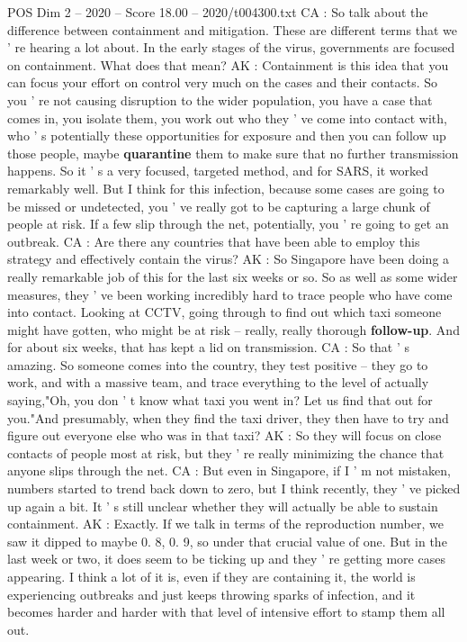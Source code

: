 \begin{textsample}{POS Dim 2 – 2020 – Score 18.00 – 2020/t004300.txt}
CA : So talk about the difference between containment and mitigation.
These are different terms that we ' re hearing a lot about.
In the early stages of the virus, governments are focused on containment.
What does that mean?
AK : Containment is this idea that you can focus your effort on control very much on the cases and their contacts.
So you ' re not causing disruption to the wider population, you have a case that comes in, you isolate them, you work out who they ' ve come into contact with, who ' s potentially these opportunities for exposure and then you can follow up those people, maybe \textbf{quarantine} them to make sure that no further transmission happens.
So it ' s a very focused, targeted method, and for SARS, it worked remarkably well.
But I think for this infection, because some cases are going to be missed or undetected, you ' ve really got to be capturing a large chunk of people at risk.
If a few slip through the net, potentially, you ' re going to get an outbreak.
CA : Are there any countries that have been able to employ this strategy and effectively contain the virus?
AK : So Singapore have been doing a really remarkable job of this for the last six weeks or so.
So as well as some wider measures, they ' ve been working incredibly hard to trace people who have come into contact.
Looking at CCTV, going through to find out which taxi someone might have gotten, who might be at risk -- really, really thorough \textbf{follow-up}.
And for about six weeks, that has kept a lid on transmission.
CA : So that ' s amazing.
So someone comes into the country, they test positive -- they go to work, and with a massive team, and trace everything to the level of actually saying,"Oh, you don ' t know what taxi you went in?
Let us find that out for you."And presumably, when they find the taxi driver, they then have to try and figure out everyone else who was in that taxi?
AK : So they will focus on close contacts of people most at risk, but they ' re really minimizing the chance that anyone slips through the net.
CA : But even in Singapore, if I ' m not mistaken, numbers started to trend back down to zero, but I think recently, they ' ve picked up again a bit.
It ' s still unclear whether they will actually be able to sustain containment.
AK : Exactly.
If we talk in terms of the reproduction number, we saw it dipped to maybe 0. 8, 0. 9, so under that crucial value of one.
But in the last week or two, it does seem to be ticking up and they ' re getting more cases appearing.
I think a lot of it is, even if they are containing it, the world is experiencing outbreaks and just keeps throwing sparks of infection, and it becomes harder and harder with that level of intensive effort to stamp them all out.

\end{textsample}
